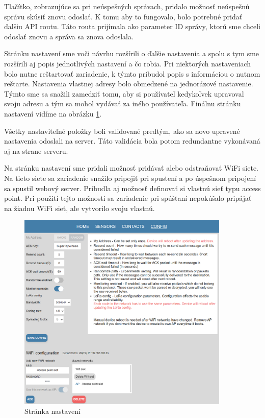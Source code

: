 \documentclass[slovak,master]{diploma}
\begin{document}
Tlačítko, zobrazujúce sa pri neúspešných správach, pridalo možnosť neúspešnú správu skúsiť znovu odoslať. K tomu aby to fungovalo, 
bolo potrebné pridať ďalšiu API routu. Táto routa prijímala ako parameter ID správy, ktorú sme chceli odoslať znovu a správa sa znova odoslala.

Stránku nastavení sme voči návrhu rozšírili o ďalšie nastavenia a spolu s tym sme rozšírili aj popis jednotlivých nastavení a čo robia. 
Pri niektorých nastaveniach bolo nutne reštartovať zariadenie, k týmto pribudol popis s informáciou o nutnom reštarte. 
Nastavenia vlastnej adresy bolo obmedzené na jednorázové nastavenie. Týmto sme sa snažili zamedziť tomu, aby si používateľ kedykoľvek 
upravoval svoju adresu a tým sa mohol vydávať za iného používateľa. Finálnu stránku nastavení vidíme na obrázku \ref{fig:webConfig}.

Všetky nastaviteľné položky boli validované predtým, ako sa novo upravené nastavenia odoslali na server. Táto validácia bola potom redundantne 
vykonávaná aj na strane serveru.

Na stránku nastavení sme pridali možnosť pridávať alebo odstraňovať WiFi siete. Na tieto siete sa zariadenie snažilo pripojiť pri spustení a 
po úspešnom pripojení sa spustil webový server. Pribudla aj možnosť definovať si vlastnú sieť typu access point. Pri použití tejto možnosti sa zariadenie pri spúštaní 
nepokúšalo pripájať na žiadnu WiFi sieť, ale vytvorilo svoju vlastnú.

\begin{figure}[h!]
  \centering
  \includegraphics[width=0.9\textwidth]{Figures/webConfig.png}
  \caption{Stránka nastavení}
  \label{fig:webConfig}
\end{figure}
\end{document}
